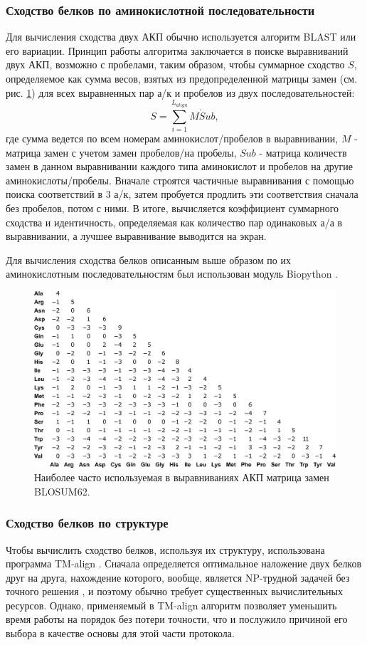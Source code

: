 \documentclass[a4paper,14pt]{article}         %
\begin{document}
\subsubsection{Сходство белков по аминокислотной последовательности}
Для вычисления сходства двух АКП обычно используется алгоритм BLAST \cite{ALTSCHUL1990403} или его вариации. Принцип работы алгоритма заключается в поиске выравниваний двух АКП, возможно с пробелами, таким образом, чтобы суммарное сходство $S$, определяемое как сумма весов, взятых из предопределенной матрицы замен (см. рис. \ref{fig:blosum}) для всех выравненных пар а/к и пробелов из двух последовательностей:
	\begin{equation*}
	S = \sum_{i=1}^{L_{align}} M\dot Sub,
	\end{equation*}
	где сумма ведется по всем номерам аминокислот/пробелов в выравнивании, $M$ - матрица замен с учетом замен пробелов/на пробелы, $Sub$ - матрица количеств замен в данном выравнивании каждого типа аминокислот и пробелов на другие аминокислоты/пробелы.
Вначале строятся частичные выравнивания с помощью поиска соответствий в 3 а/к, затем пробуется продлить эти соответствия сначала без пробелов, потом с ними. В итоге, вычисляется коэффициент суммарного сходства и идентичность, определяемая как количество пар одинаковых а/а в выравнивании, а лучшее выравнивание выводится на экран.

Для вычисления сходства белков описанным выше образом по их аминокислотным последовательностям был использован модуль Biopython \cite{biopython}.
\begin{figure}[h] 
	\centering
	\includegraphics[width=0.8\linewidth]{pictures/BLOSUM62}
	\caption{Наиболее часто используемая в выравниваниях АКП матрица замен BLOSUM62.}
	\label{fig:blosum}
\end{figure}
\subsubsection{Сходство белков по структуре} \label{TM principle}
Чтобы вычислить сходство белков, используя их структуру, использована программа TM-align \cite{TM, TMalign}. Сначала определяется оптимальное наложение двух белков друг на друга, нахождение которого, вообще, является NP-трудной задачей без точного решения \cite{Lathrop1994}, и поэтому обычно требует существенных вычислительных ресурсов. Однако, применяемый в TM-align алгоритм позволяет уменьшить время работы на порядок без потери точности, что и послужило причиной его выбора в качестве основы для этой части протокола.
\end{document}

